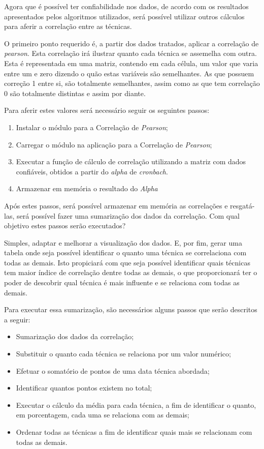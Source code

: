 Agora que é possível ter confiabilidade nos dados, de acordo com os resultados apresentados pelos algoritmos utilizados, será
possível
utilizar outros cálculos para aferir a correlação entre as técnicas.

O primeiro ponto requerido é, a partir dos dados tratados, aplicar a correlação de \textit{pearson}. Esta correlação irá ilustrar
quanto cada técnica se assemelha com outra. Esta é representada em uma matriz, contendo em cada célula, um valor que varia entre um
e zero dizendo o quão estas variáveis são semelhantes. As que possuem correção 1 entre si, são totalmente semelhantes, assim como as que tem
correlação 0 são totalmente distintas e assim por diante.

Para aferir estes valores será necessário seguir os seguintes passos:

\begin{enumerate}
    \item Instalar o módulo para a Correlação de \textit{Pearson};
    \item Carregar o módulo  na aplicação para a Correlação de \textit{Pearson};
    \item Executar a função de cálculo de correlação utilizando a matriz com dados confiáveis, obtidos a partir do \textit{alpha} de \textit{cronbach}.
    \item Armazenar em memória o resultado do \textit{Alpha}
\end{enumerate}

Após estes passos, será possível armazenar em memória as correlações e resgatá-las, será possível fazer uma sumarização dos dados
da correlação. Com qual objetivo estes passos serão executados?

Simples, adaptar e melhorar a visualização dos dados. E, por fim, gerar uma tabela onde seja possível identificar o quanto uma técnica
se correlaciona com todas as demais. Isto propiciará com que seja possível identificar quais técnicas tem maior índice de correlação
dentre todas as demais, o que proporcionará ter o poder de descobrir qual técnica é mais influente e se relaciona com todas as demais.


Para executar essa sumarização, são necessários alguns passos que serão descritos a seguir:

\begin{itemize}
    \item Sumarização dos dados da correlação;
    \item Substituir o quanto cada técnica se relaciona por um valor numérico;
    \item Efetuar o somatório de pontos de uma data técnica abordada;
    \item Identificar quantos pontos existem no total;
    \item Executar o cálculo da média para cada técnica, a fim de identificar o quanto, em porcentagem, cada uma
        se relaciona com as demais;
    \item Ordenar todas as técnicas a fim de identificar quais mais se relacionam com todas as demais.
\end{itemize}

